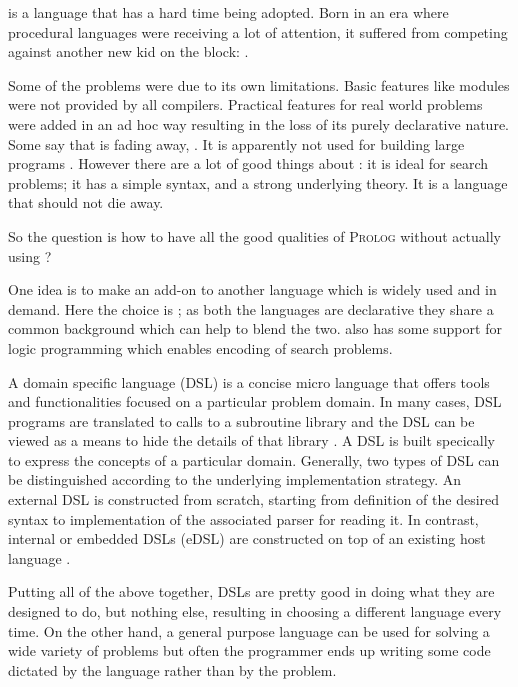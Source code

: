\documentclass[thesis-solanki.tex]{subfiles}
\begin{document}
 is a language that has a hard time being adopted.
Born in an era where procedural languages were receiving a lot of attention, it suffered from competing against
another new kid on the block: .

Some of the problems were due to its own limitations.
Basic features like modules were not provided by all compilers.
Practical features for real world problems were added in an ad hoc way resulting in the loss of its purely
declarative nature.
Some say that  is fading away,
\cite{website:prolog-steam,website:prolog-death,website:prolog-killer}.
It is apparently not used for building large programs \cite{wikiprolog,somogyi1995logic,website:prolog1000db}.
However there are a lot of good things about : it is ideal for search problems; it has a simple
syntax, and a strong underlying theory.
It is a language that should not die away.

So the question is how to have all the good qualities of \textsc{Prolog} without actually using ?

One idea is to make  an add-on to another language which is widely used and in demand.
Here the choice is ; as both the languages are declarative they share a common background which
can help to blend the two.
 also has some support for logic programming \cite{website:logic-programming-haskell} which
enables encoding of search problems.

A domain specific language (DSL) is a concise micro language that offers tools and functionalities focused on a
particular problem domain.\label{sec:DSL-def} In many cases, DSL programs are translated to calls to a
subroutine library and the DSL can be viewed as a means to hide the details of that library \cite{van2000domain}.
A DSL is built specically to express the concepts of a particular domain.
Generally, two types of DSL can be distinguished according to the underlying implementation strategy.
An external DSL is constructed from scratch, starting from definition of the desired syntax to
implementation of the associated parser for reading it.
In contrast, internal or embedded DSLs (eDSL) are constructed on top of an existing host language \cite{machadomodel}.

Putting all of the above together, DSLs are pretty good in doing what they are designed to do,
but nothing else, resulting in choosing a different language every time.
On the other hand, a general purpose language can be used for solving a wide variety of problems but often the
programmer ends up writing some code dictated by the language rather than by the problem.
\end{document}
